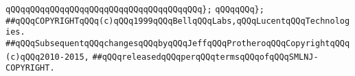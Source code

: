 \verb|qQQqqQQqqQQqqQQqqQQqqQQqqQQqqQQqqQQqqQQq};|\newline
\newline
\verb|qQQqqQQq};|\newline
\newline
\newline
\newline
\verb|##qQQqCOPYRIGHTqQQq(c)qQQq1999qQQqBellqQQqLabs,qQQqLucentqQQqTechnologies.|\newline
\verb|##qQQqSubsequentqQQqchangesqQQqbyqQQqJeffqQQqProtheroqQQqCopyrightqQQq(c)qQQq2010-2015,|\newline
\verb|##qQQqreleasedqQQqperqQQqtermsqQQqofqQQqSMLNJ-COPYRIGHT.|\newline

